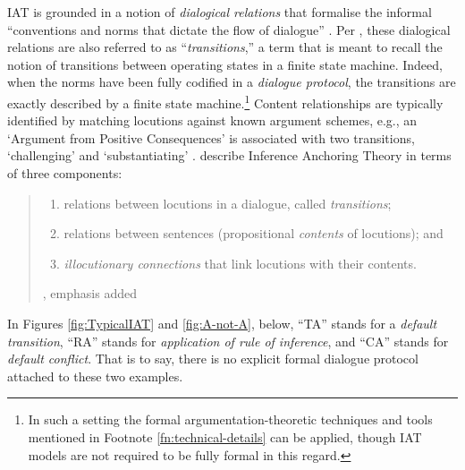 \documentclass[smallextended,oneside]{svjour3}       %
\let\cite\citep
\newcommand\nothing[1]{#1}
\let\paragraph\nothing
\begin{document}
\paragraph{IAT is grounded in a notion of \emph{dialogical relations} that formalise the informal ``conventions and norms that dictate the flow of dialogue'' \cite{snaith2016dialogue}.}
Per \citet{budzynska2011speech}, these dialogical relations are also
referred to as ``\emph{transitions},'' a term that is meant to recall
the notion of transitions between operating states in a finite state
machine.  Indeed, when the norms have been fully codified in a
\emph{dialogue protocol}, the transitions are exactly described by a
finite state machine.\footnote{In such a setting the formal
  argumentation-theoretic techniques and tools mentioned in Footnote
  \ref {fn:technical-details} can be applied, though IAT models are
  not required to be fully formal in this regard.}  Content
relationships are typically identified by matching locutions against
known argument schemes, e.g., an `Argument from Positive Consequences'
is associated with two transitions, `challenging' and `substantiating'
\cite{walton08}.
\citet{budzynska2014towards} describe Inference Anchoring Theory in terms of three components:
\begin{quote}
\begin{enumerate}[align=Center,label=(\roman*),labelsep=4pt,leftmargin=*,labelwidth=!]
\item\label{transitions-item} relations between locutions in a dialogue, called \emph{transitions};
\item\label{contents-item} relations between sentences (propositional \emph{contents} of
  locutions); and
\item\label{connections-item} \emph{illocutionary connections} that link locutions with their
  contents.
\end{enumerate}
\hfill \cite{budzynska2014towards}, emphasis added
\end{quote}

In Figures \ref{fig:TypicalIAT} and \ref{fig:A-not-A}, below, ``TA''
stands for a \emph{default transition}, ``RA'' stands for
\emph{application of rule of inference}, and ``CA'' stands for
\emph{default conflict}.  That is to say, there is no explicit formal dialogue
protocol attached to these two examples.

\end{document}
